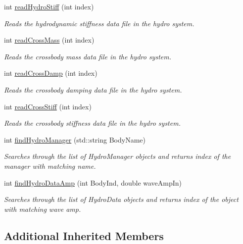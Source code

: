 \begin{DoxyCompactItemize}
int \hyperlink{classosea_1_1_hydro_reader_aa0166091098cac0b9b561e343bcba643}{read\-Hydro\-Stiff} (int index)
\begin{DoxyCompactList}\small\item\em Reads the hydrodynamic stiffness data file in the hydro system. \end{DoxyCompactList}\item 
int \hyperlink{classosea_1_1_hydro_reader_ab7abea48d4b6598ea120bf2da2a6ceae}{read\-Cross\-Mass} (int index)
\begin{DoxyCompactList}\small\item\em Reads the crossbody mass data file in the hydro system. \end{DoxyCompactList}\item 
int \hyperlink{classosea_1_1_hydro_reader_a1daa6fd5fd43a0ef9c307843659b7ef2}{read\-Cross\-Damp} (int index)
\begin{DoxyCompactList}\small\item\em Reads the crossbody damping data file in the hydro system. \end{DoxyCompactList}\item 
int \hyperlink{classosea_1_1_hydro_reader_aa78393216be977d4cf1dcef10ba5ab69}{read\-Cross\-Stiff} (int index)
\begin{DoxyCompactList}\small\item\em Reads the crossbody stiffness data file in the hydro system. \end{DoxyCompactList}\item 
int \hyperlink{classosea_1_1_hydro_reader_a22588f0b67c4eb9ddf919afd4f50dd68}{find\-Hydro\-Manager} (std\-::string Body\-Name)
\begin{DoxyCompactList}\small\item\em Searches through the list of Hydro\-Manager objects and returns index of the manager with matching name. \end{DoxyCompactList}\item 
int \hyperlink{classosea_1_1_hydro_reader_af6820a74d0b4181d76f69b67bfd3916e}{find\-Hydro\-Data\-Amp} (int Body\-Ind, double wave\-Amp\-In)
\begin{DoxyCompactList}\small\item\em Searches through the list of Hydro\-Data objects and returns index of the object with matching wave amp. \end{DoxyCompactList}\end{DoxyCompactItemize}
\subsection*{Additional Inherited Members}


